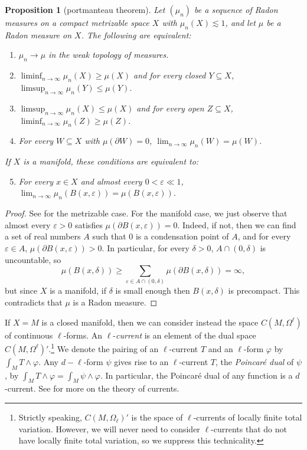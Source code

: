 \documentclass[reqno,11pt]{amsart}
\newcommand{\dfn}[1]{\emph{#1}\index{#1}}
\newtheorem{proposition}[theorem]{Proposition}
\theoremstyle{definition}
\numberwithin{equation}{section}
\begin{document}
\begin{proposition}[portmanteau theorem]
	Let $(\mu_n)$ be a sequence of Radon measures on a compact metrizable space $X$ with $\mu_n(X) \lesssim 1$, and let $\mu$ be a Radon measure on $X$. The following are equivalent:
\begin{enumerate}
	\item $\mu_n \to \mu$ in the weak topology of measures.
	\item $\liminf_{n \to \infty} \mu_n(X) \geq \mu(X)$ and for every closed $Y \subseteq X$, $\limsup_{n \to \infty} \mu_n(Y) \leq \mu(Y)$.
	\item $\limsup_{n \to \infty} \mu_n(X) \leq \mu(X)$ and for every open $Z \subseteq X$, $\liminf_{n \to \infty} \mu_n(Z) \geq \mu(Z)$.
	\item For every $W \subseteq X$ with $\mu(\partial W) = 0$, $\lim_{n \to \infty} \mu_n(W) = \mu(W)$.
\end{enumerate}
	If $X$ is a manifold, these conditions are equivalent to:
\begin{enumerate}
	\setcounter{enumi}{4}
	\item For every $x \in X$ and almost every $0 < \varepsilon \ll 1$, $\lim_{n \to \infty} \mu_n(B(x, \varepsilon)) = \mu(B(x, \varepsilon))$.
\end{enumerate}
\end{proposition}
\begin{proof}
	See \cite[Theorem 13.16]{klenke2013probability} for the metrizable case.
	For the manifold case, we just observe that almost every $\varepsilon > 0$ satisfies $\mu(\partial B(x, \varepsilon)) = 0$. Indeed, if not, then we can find a set of real numbers $A$ such that $0$ is a condensation point of $A$, and for every $\varepsilon \in A$, $\mu(\partial B(x, \varepsilon)) > 0$.
	In particular, for every $\delta > 0$, $A \cap (0, \delta)$ is uncountable, so
	$$\mu(B(x, \delta)) \geq \sum_{\varepsilon \in A \cap (0, \delta)} \mu(\partial B(x, \delta)) = \infty,$$
	but since $X$ is a manifold, if $\delta$ is small enough then $B(x, \delta)$ is precompact.
	This contradicts that $\mu$ is a Radon measure.
\end{proof}

If $X = M$ is a closed manifold, then we can consider instead the space $C(M, \Omega^\ell)$ of continuous $\ell$-forms.
An $\ell$-\dfn{current} is an element of the dual space $C(M, \Omega^\ell)'$.\footnote{Strictly speaking, $C(M, \Omega_\ell)'$ is the space of $\ell$-currents of locally finite total variation. However, we will never need to consider $\ell$-currents that do not have locally finite total variation, so we suppress this technicality.}
We denote the pairing of an $\ell$-current $T$ and an $\ell$-form $\varphi$ by $\int_M T \wedge \varphi$.
Any $d-\ell$-form $\psi$ gives rise to an $\ell$-current $T$, the \dfn{Poincar\'e dual} of $\psi$, by $\int_M T \wedge \varphi = \int_M \psi \wedge \varphi$.
In particular, the Poincar\'e dual of any function is a $d$-current.
See \cite{simon1983GMT} for more on the theory of currents.
\end{document}

